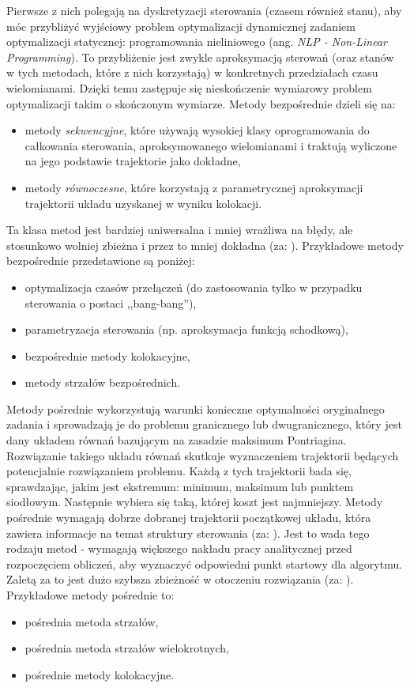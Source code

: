 Pierwsze z nich polegają na dyskretyzacji sterowania (czasem również stanu), aby móc przybliżyć wyjściowy problem optymalizacji dynamicznej zadaniem optymalizacji statycznej: programowania nieliniowego (ang. \emph{NLP - Non-Linear Programming}). To przybliżenie jest zwykle aproksymacją sterowań (oraz stanów w tych metodach, które z nich korzystają) w konkretnych przedziałach czasu wielomianami. Dzięki temu zastępuje się nieskończenie wymiarowy problem optymalizacji takim o skończonym wymiarze.
Metody bezpośrednie dzieli się na:
\begin{itemize}
    \item metody \emph{sekwencyjne}, które używają wysokiej klasy oprogramowania do całkowania sterowania, aproksymowanego wielomianami i traktują wyliczone na jego podstawie trajektorie jako dokładne,
    \item metody \emph{równoczesne}, które korzystają z parametrycznej aproksymacji trajektorii układu uzyskanej w wyniku kolokacji.
\end{itemize}

Ta klasa metod jest bardziej uniwersalna i mniej wrażliwa na błędy, ale stosunkowo wolniej zbieżna i przez to mniej dokładna (za: \cite{Korytowski2015}).
Przykładowe metody bezpośrednie przedstawione są poniżej:
\begin{itemize}
    \item optymalizacja czasów przełączeń (do zastosowania tylko w przypadku sterowania o postaci ,,bang-bang''),
    \item parametryzacja sterowania (np. aproksymacja funkcją schodkową),
    \item bezpośrednie metody kolokacyjne,
    \item metody strzałów bezpośrednich.
\end{itemize}

Metody pośrednie wykorzystują warunki konieczne optymalności oryginalnego zadania i sprowadzają je do problemu granicznego lub dwugranicznego, który jest dany układem równań bazującym na zasadzie maksimum Pontriagina. Rozwiązanie takiego układu równań skutkuje wyznaczeniem trajektorii będących potencjalnie rozwiązaniem problemu. Każdą z tych trajektorii bada się, sprawdzając, jakim jest ekstremum: minimum, maksimum lub punktem siodłowym. Następnie wybiera się taką, której koszt jest najmniejszy. Metody pośrednie wymagają dobrze dobranej trajektorii początkowej układu, która zawiera informacje na temat struktury sterowania (za: \cite{Korytowski2015}). Jest to wada tego rodzaju metod - wymagają większego nakładu pracy analitycznej przed rozpoczęciem obliczeń, aby wyznaczyć odpowiedni punkt startowy dla algorytmu. Zaletą za to jest dużo szybsza zbieżność w otoczeniu rozwiązania (za: \cite{Korytowski2015}). Przykładowe metody pośrednie to:
\begin{itemize}
    \item pośrednia metoda strzałów,
    \item pośrednia metoda strzałów wielokrotnych,
    \item pośrednie metody kolokacyjne.
\end{itemize}

